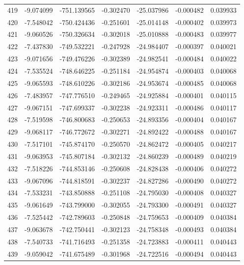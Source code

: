 \begin{tabular}{rrrrrrr}
 419 &  -9.074099 & -751.139565 & -0.302470 &  -25.037986 &   -0.000482 &  0.039933 \\
 420 &  -7.548042 & -750.424436 & -0.251601 &  -25.014148 &   -0.000402 &  0.039973 \\
 421 &  -9.060526 & -750.326634 & -0.302018 &  -25.010888 &   -0.000483 &  0.039977 \\
 422 &  -7.437830 & -749.532221 & -0.247928 &  -24.984407 &   -0.000397 &  0.040021 \\
 423 &  -9.071656 & -749.476226 & -0.302389 &  -24.982541 &   -0.000484 &  0.040022 \\
 424 &  -7.535524 & -748.646225 & -0.251184 &  -24.954874 &   -0.000403 &  0.040068 \\
 425 &  -9.065593 & -748.610226 & -0.302186 &  -24.953674 &   -0.000485 &  0.040068 \\
 426 &  -7.483957 & -747.776510 & -0.249465 &  -24.925884 &   -0.000401 &  0.040115 \\
 427 &  -9.067151 & -747.699337 & -0.302238 &  -24.923311 &   -0.000486 &  0.040117 \\
 428 &  -7.519598 & -746.800683 & -0.250653 &  -24.893356 &   -0.000404 &  0.040167 \\
 429 &  -9.068117 & -746.772672 & -0.302271 &  -24.892422 &   -0.000488 &  0.040167 \\
 430 &  -7.517101 & -745.874170 & -0.250570 &  -24.862472 &   -0.000405 &  0.040217 \\
 431 &  -9.063953 & -745.807184 & -0.302132 &  -24.860239 &   -0.000489 &  0.040219 \\
 432 &  -7.518226 & -744.853146 & -0.250608 &  -24.828438 &   -0.000406 &  0.040272 \\
 433 &  -9.067096 & -744.818591 & -0.302237 &  -24.827286 &   -0.000490 &  0.040272 \\
 434 &  -7.533231 & -743.850888 & -0.251108 &  -24.795030 &   -0.000408 &  0.040327 \\
 435 &  -9.061649 & -743.799000 & -0.302055 &  -24.793300 &   -0.000491 &  0.040327 \\
 436 &  -7.525442 & -742.789603 & -0.250848 &  -24.759653 &   -0.000409 &  0.040384 \\
 437 &  -9.063678 & -742.750441 & -0.302123 &  -24.758348 &   -0.000493 &  0.040384 \\
 438 &  -7.540733 & -741.716493 & -0.251358 &  -24.723883 &   -0.000411 &  0.040443 \\
 439 &  -9.059042 & -741.675489 & -0.301968 &  -24.722516 &   -0.000494 &  0.040443 \\

\end{tabular}
